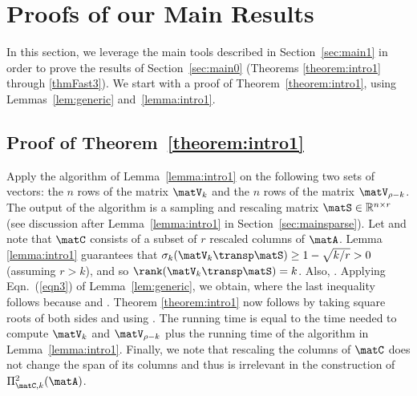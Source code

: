 \section{Proofs of our Main Results}
\label{sec:PROOFS}

In this section, we leverage the main tools described in Section~\ref{sec:main1} in order to prove the results of Section~\ref{sec:main0} (Theorems \ref{theorem:intro1} through \ref{thmFast3}). We start with a proof of Theorem~\ref{theorem:intro1},
using Lemmas~\ref{lem:generic} and~\ref{lemma:intro1}.

\subsection{Proof of Theorem~\ref{theorem:intro1}}
Apply the algorithm of Lemma~\ref{lemma:intro1}
on the following two sets of vectors:
the $n$ rows of the matrix $\matV_k$ and the $n$ rows of the matrix
$\matV_{\rho-k}$. The output of the algorithm is a sampling and
rescaling matrix $\matS \in \mathbb{R}^{n \times r}$
(see discussion after Lemma~\ref{lemma:intro1} in
Section~\ref{sec:mainsparse}). Let  and note that
$\matC$ consists of a subset of $r$ rescaled
 columns of $\matA$. Lemma \ref{lemma:intro1} guarantees that $\sigma_{k}(\matV_k\transp\matS)\geq 1-\sqrt{k/r}>0$ (assuming $r>k$), and so $\rank(\matV_k\transp\matS)=k$. Also,
.
Applying Eqn.~(\ref{eqn3}) of Lemma~\ref{lem:generic}, we obtain,
where the last inequality follows because
 and
.
Theorem \ref{theorem:intro1} now follows by taking square roots of
both sides and using .
The running time is equal to the time needed to compute
$\matV_k$ and $\matV_{\rho-k}$ plus the running time of the algorithm in
Lemma~\ref{lemma:intro1}. Finally, we note that rescaling the
columns of $\matC$ does not change the span of its columns and
thus is irrelevant
in the construction of $\Pi_{\matC,k}^2(\matA)$.


